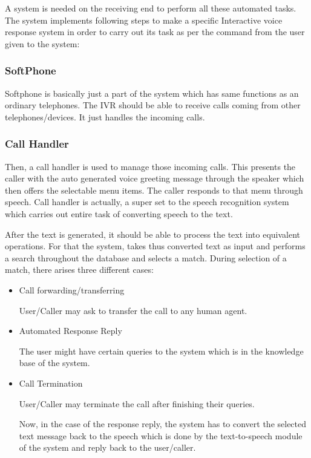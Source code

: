 A system is needed on the receiving end to perform all these automated tasks. The system implements following steps to make a specific Interactive voice response system
in order to carry out its task as per the command from the user given to the system: 

\subsubsection{SoftPhone}
Softphone is basically just a part of the system which has same functions as an ordinary telephones. The IVR should be able to receive calls coming from other telephones/devices. It just handles the incoming calls. 
\subsubsection{Call Handler}
Then, a call handler is used to manage those incoming calls. This presents the caller with the auto generated voice greeting message through the speaker which then offers the selectable menu items. The caller responds to that menu through speech. 
Call handler is actually, a super set to the speech recognition system which carries out entire task of converting speech to the text. 

After the text is generated, it should be able to process the text into equivalent operations. For that the system, takes thus converted text as input and performs a search throughout the database and selects a match. During selection of a match, there arises three different cases:
\begin{itemize}
	\item Call forwarding/transferring
	
	User/Caller may ask to transfer the call to any human agent. 
	\item Automated Response Reply 
	
	
	The user might have certain queries to the system which is in the knowledge base of the system. 
	
	\item Call Termination 
	
	
	User/Caller may terminate the call after finishing their queries. 
	
	
	
	Now, in the case of the response reply, the system has to convert the selected text message back to the speech which is done by the text-to-speech module of the system and reply back to the user/caller. 
\end{itemize}






